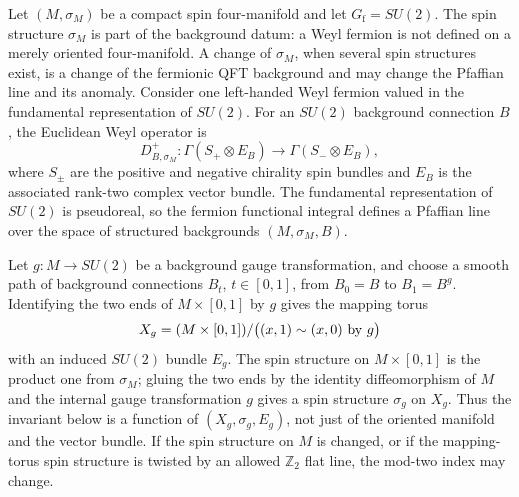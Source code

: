Let \((M,\sigma_M)\) be a compact spin four-manifold and let
\(G_{\mathrm f}=SU(2)\).  The spin structure \(\sigma_M\) is part of the
background datum: a Weyl fermion is not defined on a merely oriented
four-manifold.  A change of \(\sigma_M\), when several spin structures exist,
is a change of the fermionic QFT background and may change the Pfaffian line
and its anomaly.  Consider one left-handed Weyl fermion valued in the
fundamental representation of \(SU(2)\).  For an \(SU(2)\) background
connection \(B\), the Euclidean Weyl operator is
\[
  D_{B,\sigma_M}^+:
  \Gamma(S_+\otimes E_B)
  \longrightarrow
  \Gamma(S_-\otimes E_B),
\]
where \(S_\pm\) are the positive and negative chirality spin bundles and
\(E_B\) is the associated rank-two complex vector bundle.  The fundamental
representation of \(SU(2)\) is pseudoreal, so the fermion functional integral
defines a Pfaffian line over the space of structured backgrounds
\((M,\sigma_M,B)\).

Let \(g:M\to SU(2)\) be a background gauge transformation, and choose a smooth
path of background connections \(B_t\), \(t\in[0,1]\), from \(B_0=B\) to
\(B_1=B^g\).  Identifying the two ends of \(M\times[0,1]\) by \(g\) gives the
mapping torus
\[
  X_g
  =
  (M\times[0,1])/\bigl((x,1)\sim(x,0)\hbox{ by }g\bigr)
\]
with an induced \(SU(2)\) bundle \(E_g\).  The spin structure on
\(M\times[0,1]\) is the product one from \(\sigma_M\); gluing the two ends
by the identity diffeomorphism of \(M\) and the internal gauge transformation
\(g\) gives a spin structure \(\sigma_g\) on \(X_g\).  Thus the invariant
below is a function of \((X_g,\sigma_g,E_g)\), not just of the oriented
manifold and the vector bundle.  If the spin structure on \(M\) is changed, or
if the mapping-torus spin structure is twisted by an allowed
\(\mathbb Z_2\) flat line, the mod-two index may change.

